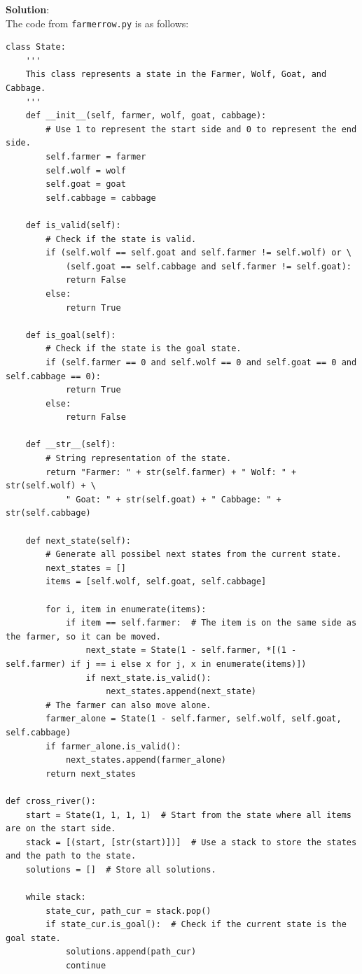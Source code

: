 \documentclass[UTF8]{ctexart}
\begin{document}
\textbf{\large Solution}:\\
The code from \texttt{farmerrow.py} is as follows:
\begin{lstlisting}
class State:
    '''
    This class represents a state in the Farmer, Wolf, Goat, and Cabbage.
    '''
    def __init__(self, farmer, wolf, goat, cabbage):
        # Use 1 to represent the start side and 0 to represent the end side.
        self.farmer = farmer
        self.wolf = wolf
        self.goat = goat
        self.cabbage = cabbage
        
    def is_valid(self):
        # Check if the state is valid.
        if (self.wolf == self.goat and self.farmer != self.wolf) or \
            (self.goat == self.cabbage and self.farmer != self.goat):
            return False
        else:
            return True
        
    def is_goal(self):
        # Check if the state is the goal state.
        if (self.farmer == 0 and self.wolf == 0 and self.goat == 0 and self.cabbage == 0):
            return True
        else:
            return False
    
    def __str__(self):
        # String representation of the state.
        return "Farmer: " + str(self.farmer) + " Wolf: " + str(self.wolf) + \
            " Goat: " + str(self.goat) + " Cabbage: " + str(self.cabbage)
        
    def next_state(self):
        # Generate all possibel next states from the current state.
        next_states = []
        items = [self.wolf, self.goat, self.cabbage]
        
        for i, item in enumerate(items):
            if item == self.farmer:  # The item is on the same side as the farmer, so it can be moved.
                next_state = State(1 - self.farmer, *[(1 - self.farmer) if j == i else x for j, x in enumerate(items)])
                if next_state.is_valid():
                    next_states.append(next_state)
        # The farmer can also move alone.
        farmer_alone = State(1 - self.farmer, self.wolf, self.goat, self.cabbage)
        if farmer_alone.is_valid():
            next_states.append(farmer_alone)
        return next_states
    
def cross_river():
    start = State(1, 1, 1, 1)  # Start from the state where all items are on the start side.
    stack = [(start, [str(start)])]  # Use a stack to store the states and the path to the state.
    solutions = []  # Store all solutions.
    
    while stack:
        state_cur, path_cur = stack.pop()
        if state_cur.is_goal():  # Check if the current state is the goal state.
            solutions.append(path_cur)
            continue
        

\end{lstlisting}
\end{document}

